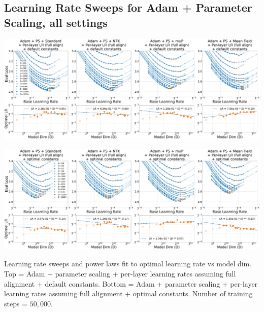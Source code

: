 \documentclass{article}
\theoremstyle{plain}
\theoremstyle{definition}
\theoremstyle{remark}
\begin{document}
\thispagestyle{plain}
\begin{SidewaysFigure}
\subsection{Learning Rate Sweeps for Adam + Parameter Scaling, all settings}
\label{sec:app_lr_sweeps_adam_ps}
\vspace{12pt}
\includegraphics[width=0.98\linewidth]{icml2024/figures/lr_sweeps/appendix/adam_ps/adam_ps+50k_steps_per_module_lr.pdf}

\figvspace

\includegraphics[width=0.98\linewidth]{icml2024/figures/lr_sweeps/appendix/adam_ps/adam_ps+50k_steps_per_module_lr_optimal_constants.pdf}
\caption{Learning rate sweeps and power laws fit to optimal learning rate vs model dim. Top = Adam + parameter scaling + per-layer learning rates assuming full alignment + default constants. Bottom = Adam + parameter scaling + per-layer learning rates assuming full alignment + optimal constants. Number of training steps = $50{,}000$.}
\label{fig:lr_sweep_adam_ps_full_align}
\end{SidewaysFigure}
\clearpage
\end{document}
